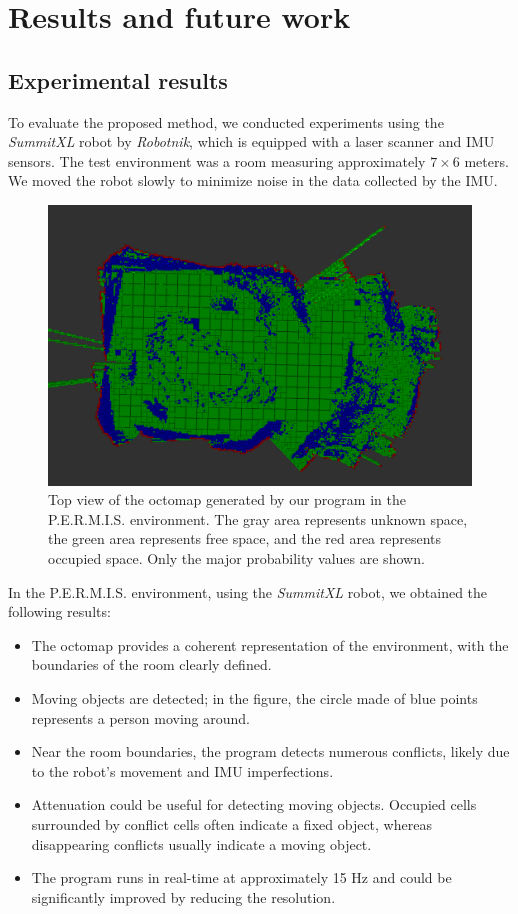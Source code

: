 \chapter{Results and future work}

\section{Experimental results}

To evaluate the proposed method, we conducted experiments using the \textit{SummitXL} robot by \textit{Robotnik}, which is equipped with a laser scanner and IMU sensors. The test environment was a room measuring approximately $7 \times 6$ meters. We moved the robot slowly to minimize noise in the data collected by the IMU.

\begin{figure}[H]
    \centering
    \includegraphics[width=\textwidth]{images/top_screenshot.png}
    \caption{Top view of the octomap generated by our program in the P.E.R.M.I.S. environment. The gray area represents unknown space, the green area represents free space, and the red area represents occupied space. Only the major probability values are shown.}
\end{figure}

In the P.E.R.M.I.S. environment, using the \textit{SummitXL} robot, we obtained the following results:

\begin{itemize}
    \item The octomap provides a coherent representation of the environment, with the boundaries of the room clearly defined.
    \item Moving objects are detected; in the figure, the circle made of blue points represents a person moving around.
    \item Near the room boundaries, the program detects numerous conflicts, likely due to the robot's movement and IMU imperfections.
    \item Attenuation could be useful for detecting moving objects. Occupied cells surrounded by conflict cells often indicate a fixed object, whereas disappearing conflicts usually indicate a moving object.
    \item The program runs in real-time at approximately 15 Hz and could be significantly improved by reducing the resolution.
\end{itemize}

